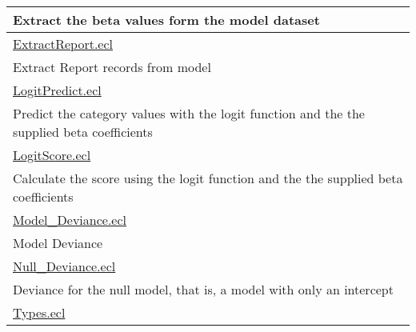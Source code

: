 {\begin{longtable}{|p{\textwidth}|}
Extract the beta values form the model dataset \\
\hline
\hyperlink{ecldoc:toc:LogisticRegression.ExtractReport}{ExtractReport.ecl} \\
Extract Report records from model \\
\hline
\hyperlink{ecldoc:toc:LogisticRegression.LogitPredict}{LogitPredict.ecl} \\
Predict the category values with the logit function and the the supplied beta coefficients \\
\hline
\hyperlink{ecldoc:toc:LogisticRegression.LogitScore}{LogitScore.ecl} \\
Calculate the score using the logit function and the the supplied beta coefficients \\
\hline
\hyperlink{ecldoc:toc:LogisticRegression.Model_Deviance}{Model\_Deviance.ecl} \\
Model Deviance \\
\hline
\hyperlink{ecldoc:toc:LogisticRegression.Null_Deviance}{Null\_Deviance.ecl} \\
Deviance for the null model, that is, a model with only an intercept \\
\hline
\hyperlink{ecldoc:toc:LogisticRegression.Types}{Types.ecl} \\
\hline
\end{longtable}
}



















